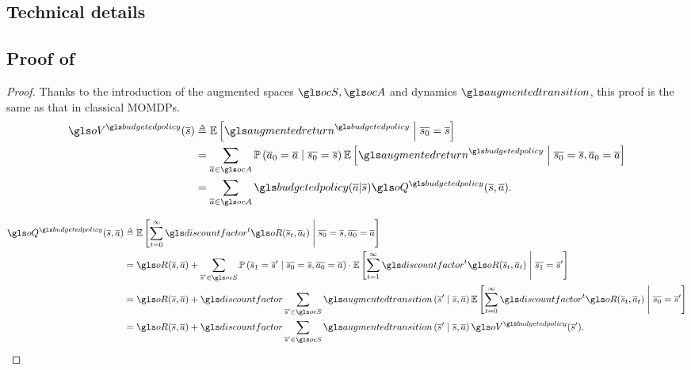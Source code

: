 \begin{subappendices}

\section{Technical details}
\label{sec:proofs}
\subsection{Proof of }
\label{sec:proof-bell-expect}
\begin{proof}
	Thanks to the introduction of the augmented spaces $\ocS, \ocA$ and dynamics $\augmentedtransition$, this proof is the same as that in classical \glspl{MOMDP}.
	\begin{align*}
	\oV^{\budgetedpolicy}(\os) &\eqdef \expectedvalue\left[ \augmentedreturn^{\budgetedpolicy} \condbar \ov{s_0} = \os\right] \\
	&=\sum_{\oa\in\ocA} \probability{\oa_0 = \oa \condbar\ov{s_0} = \os} \expectedvalue\left[ \augmentedreturn^{\budgetedpolicy} \condbar \ov{s_0} = \os, \oa_0 = \oa\right]\\
	&= \sum_{\oa\in\ocA} \budgetedpolicy(\oa | \os) \oQ^{\budgetedpolicy}(\os,\oa).
	\end{align*}
	
	\begin{align*}
	\oQ^{\budgetedpolicy}(\os, \oa) &\eqdef \expectedvalue\left[\sum_{t=0}^\infty \discountfactor^t \augmentedreward(\os_t, \oa_t)\condbar \ov{s_0} = \os, \ov{a_0} = \oa\right] \\
	&= \augmentedreward(\os, \oa) + \sum_{\os'\in\ocS}\probability{\os_1 = \os' \condbar\ov{s_0} = \os, \ov{a_0} = \oa}\cdot \expectedvalue\left[\sum_{t=1}^\infty \discountfactor^t \augmentedreward(\os_t, \oa_t)\condbar \ov{s_1} = \os'\right] \\
	&= \augmentedreward(\os, \oa) + \discountfactor\sum_{\os'\in\ocS}\augmentedtransition\left(\os' \condbar\os, \oa\right) \expectedvalue\left[\sum_{t=0}^\infty \discountfactor^t \augmentedreward(\os_t, \oa_t) \condbar \ov{s_0} = \os'\right] \\
	&= \augmentedreward(\os, \oa) + \discountfactor\sum_{\os'\in\ocS}\augmentedtransition\left(\os' \condbar\os, \oa\right) \oV^{\budgetedpolicy}(\os').
	\end{align*}
	

\end{proof}
\end{subappendices}
